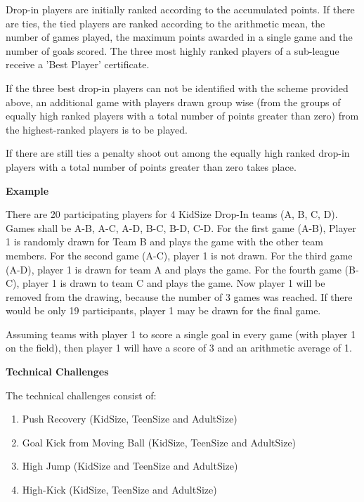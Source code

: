 Drop-in players are initially ranked according to the accumulated points. If there are ties, the tied players are ranked according to the arithmetic mean, the number of games played, the maximum points awarded in a single game and the number of goals scored. The three most highly ranked players of a sub-league receive a 'Best Player' certificate.

If the three best drop-in players can not be identified with the scheme provided above, an additional game with players drawn group wise (from the groups of equally high ranked players with a total number of points greater than zero) from the highest-ranked players is to be played.

If there are still ties a penalty shoot out among the equally high ranked drop-in players with a total number of points greater than zero takes place.

\bigskip 
 
{\bfseries Example}
 
There are 20 participating players for 4 KidSize Drop-In teams (A, B, C, D). Games shall be A-B, A-C, A-D, B-C, B-D, C-D. For the first game (A-B), Player 1 is randomly drawn for Team B and plays the game with the other team members. For the second game (A-C), player 1 is not drawn. For the third game (A-D), player 1 is drawn for team A and plays the game. For the fourth game (B-C), player 1 is drawn to team C and plays the game. Now player 1 will be removed from the drawing, because the number of 3 games was reached. If there would be only 19 participants, player 1 may be drawn for the final game.

Assuming teams with player 1 to score a single goal in every game (with player 1 on the field), then player 1 will have a score of 3 and an arithmetic average of 1.

\bigskip

{\bfseries Technical Challenges}

\headlinebox

The technical challenges consist of:

\begin{enumerate}
\item Push Recovery (KidSize, TeenSize and AdultSize)
\item Goal Kick from Moving Ball (KidSize, TeenSize and AdultSize)
\item High Jump (KidSize and TeenSize and AdultSize)
\item High-Kick (KidSize, TeenSize and AdultSize)
\end{enumerate}


